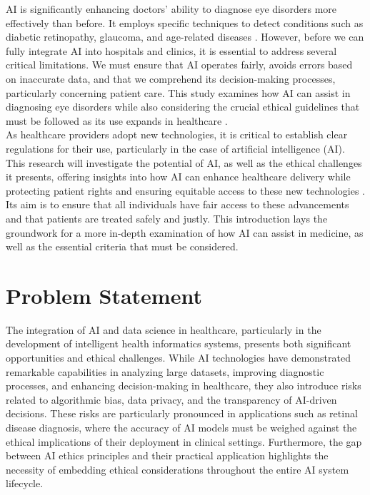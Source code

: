 \documentclass[a4paper, 12pt]{article}
\begin{document}
AI is significantly enhancing doctors' ability to diagnose eye disorders more effectively than before. It employs specific techniques to detect conditions such as diabetic retinopathy, glaucoma, and age-related diseases \cite{Fatima2024}. However, before we can fully integrate AI into hospitals and clinics, it is essential to address several critical limitations. We must ensure that AI operates fairly, avoids errors based on inaccurate data, and that we comprehend its decision-making processes, particularly concerning patient care. This study examines how AI can assist in diagnosing eye disorders while also considering the crucial ethical guidelines that must be followed as its use expands in healthcare \cite{Sarker2021}.\\

As healthcare providers adopt new technologies, it is critical to establish clear regulations for their use, particularly in the case of artificial intelligence (AI). This research will investigate the potential of AI, as well as the ethical challenges it presents, offering insights into how AI can enhance healthcare delivery while protecting patient rights and ensuring equitable access to these new technologies \cite{Nassar2021}. Its aim is to ensure that all individuals have fair access to these advancements and that patients are treated safely and justly. This introduction lays the groundwork for a more in-depth examination of how AI can assist in medicine, as well as the essential criteria that must be considered.\\


\section{Problem Statement}
The integration of AI and data science in healthcare, particularly in the development of intelligent health informatics systems, presents both significant opportunities and ethical challenges. While AI technologies have demonstrated remarkable capabilities in analyzing large datasets, improving diagnostic processes, and enhancing decision-making in healthcare, they also introduce risks related to algorithmic bias, data privacy, and the transparency of AI-driven decisions. These risks are particularly pronounced in applications such as retinal disease diagnosis, where the accuracy of AI models must be weighed against the ethical implications of their deployment in clinical settings. Furthermore, the gap between AI ethics principles and their practical application highlights the necessity of embedding ethical considerations throughout the entire AI system lifecycle.
\end{document}

